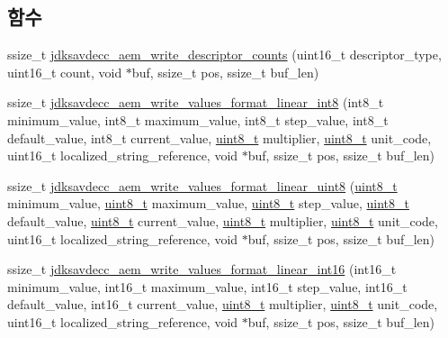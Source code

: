 \subsection*{함수}
\begin{DoxyCompactItemize}
\item 
ssize\+\_\+t \hyperlink{group__aem__descriptor_gafecb5ff1e2431035c810c3222abbabd5}{jdksavdecc\+\_\+aem\+\_\+write\+\_\+descriptor\+\_\+counts} (uint16\+\_\+t descriptor\+\_\+type, uint16\+\_\+t count, void $\ast$buf, ssize\+\_\+t pos, ssize\+\_\+t buf\+\_\+len)
\item 
ssize\+\_\+t \hyperlink{group__aem__descriptor_gae98ac239b98af7afc3d0571faa17319d}{jdksavdecc\+\_\+aem\+\_\+write\+\_\+values\+\_\+format\+\_\+linear\+\_\+int8} (int8\+\_\+t minimum\+\_\+value, int8\+\_\+t maximum\+\_\+value, int8\+\_\+t step\+\_\+value, int8\+\_\+t default\+\_\+value, int8\+\_\+t current\+\_\+value, \hyperlink{stdint_8h_aba7bc1797add20fe3efdf37ced1182c5}{uint8\+\_\+t} multiplier, \hyperlink{stdint_8h_aba7bc1797add20fe3efdf37ced1182c5}{uint8\+\_\+t} unit\+\_\+code, uint16\+\_\+t localized\+\_\+string\+\_\+reference, void $\ast$buf, ssize\+\_\+t pos, ssize\+\_\+t buf\+\_\+len)
\item 
ssize\+\_\+t \hyperlink{group__aem__descriptor_ga0f8ecbe72620dcfd4b849e96813d51b0}{jdksavdecc\+\_\+aem\+\_\+write\+\_\+values\+\_\+format\+\_\+linear\+\_\+uint8} (\hyperlink{stdint_8h_aba7bc1797add20fe3efdf37ced1182c5}{uint8\+\_\+t} minimum\+\_\+value, \hyperlink{stdint_8h_aba7bc1797add20fe3efdf37ced1182c5}{uint8\+\_\+t} maximum\+\_\+value, \hyperlink{stdint_8h_aba7bc1797add20fe3efdf37ced1182c5}{uint8\+\_\+t} step\+\_\+value, \hyperlink{stdint_8h_aba7bc1797add20fe3efdf37ced1182c5}{uint8\+\_\+t} default\+\_\+value, \hyperlink{stdint_8h_aba7bc1797add20fe3efdf37ced1182c5}{uint8\+\_\+t} current\+\_\+value, \hyperlink{stdint_8h_aba7bc1797add20fe3efdf37ced1182c5}{uint8\+\_\+t} multiplier, \hyperlink{stdint_8h_aba7bc1797add20fe3efdf37ced1182c5}{uint8\+\_\+t} unit\+\_\+code, uint16\+\_\+t localized\+\_\+string\+\_\+reference, void $\ast$buf, ssize\+\_\+t pos, ssize\+\_\+t buf\+\_\+len)
\item 
ssize\+\_\+t \hyperlink{group__aem__descriptor_ga7e2e5a76753d02b951e9b2be5a9f4229}{jdksavdecc\+\_\+aem\+\_\+write\+\_\+values\+\_\+format\+\_\+linear\+\_\+int16} (int16\+\_\+t minimum\+\_\+value, int16\+\_\+t maximum\+\_\+value, int16\+\_\+t step\+\_\+value, int16\+\_\+t default\+\_\+value, int16\+\_\+t current\+\_\+value, \hyperlink{stdint_8h_aba7bc1797add20fe3efdf37ced1182c5}{uint8\+\_\+t} multiplier, \hyperlink{stdint_8h_aba7bc1797add20fe3efdf37ced1182c5}{uint8\+\_\+t} unit\+\_\+code, uint16\+\_\+t localized\+\_\+string\+\_\+reference, void $\ast$buf, ssize\+\_\+t pos, ssize\+\_\+t buf\+\_\+len)

\end{DoxyCompactItemize}

